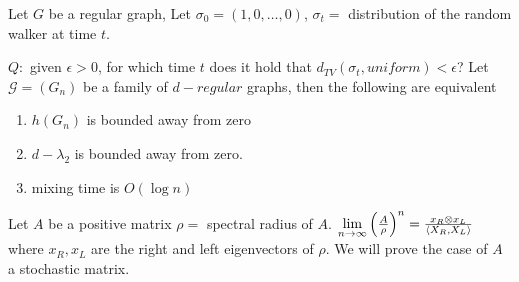 Let $G$ be a regular graph, Let $\sigma_{0}=\left(1,0,\dots,0\right)$,
$\sigma_{t}=$ distribution of the random walker at time $t$.

$Q:$ given $\epsilon>0$, for which time $t$ does it hold that $d_{TV}\left(\sigma_{t},uniform\right)<\epsilon$?
Let $\mathcal{G}=\left(G_{n}\right)$ be a family of $d-regular$
graphs, then the following are equivalent
\begin{enumerate}
\item $h\left(G_{n}\right)$ is bounded away from zero
\item $d-\lambda_{2}$ is bounded away from zero.
\item mixing time is $O\left(\log n\right)$
\end{enumerate}
Let $A$ be a positive matrix $\rho=$ spectral radius of $A$. $\lim\limits _{n\to\infty}\left(\frac{A}{\rho}\right)^{n}=\frac{x_{R}\otimes x_{L}}{\left\langle X_{R},X_{L}\right\rangle }$
where $x_{R},x_{L}$ are the right and left eigenvectors of $\rho$.
We will prove the case of $A$ a stochastic matrix.
